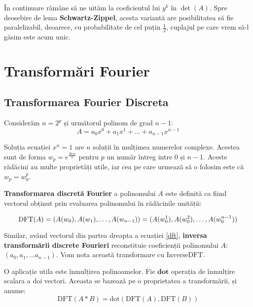 În continuare rămâne să ne uităm la coeficientul lui $y^{k}$ în $\det(A)$. Spre
deosebire de lema \textbf{Schwartz-Zippel}, acesta variantă are posibilitatea să fie
paralelizabil, deoarece, cu probabilitate de cel puțin $\frac{1}{2}$, cuplajul
pe care vrem să-l găsim este acum unic.

\pagebreak

\section{Transformări Fourier}

\subsection{Transformarea Fourier Discreta \cite{fft}}
Considerăm $n = 2^{p}$ și următorul polinom de grad $n-1$:
\begin{equation}
  A = a_{0}x^{0} + a_{1}x^{1} + \ldots + a_{n-1}x^{n-1}
\end{equation}

Soluția ecuației $x^{n} = 1$ are $n$ soluții în mulțimea numerelor complexe.
Acestea sunt de forma $w_{p} = e^{\frac{2k\pi i}{n}}$ pentru $p$ un număr întreg
intre $0$ și $n-1$. Aceste rădăcini au multe proprietăți utile, iar cea pe care
urmează să o folosim este că $w_{p} = w_{0}^{p}$. \par
\textbf{Transformarea discretă Fourier} a polinomului $A$ este definită ca fiind
vectorul obținut prin evaluarea polinomului în rădăcinile unității:

\begin{equation}
  \label{dft}
  \text{DFT}(A) = (A(w_{0}), A(w_{1}), \ldots, A(w_{n-1})) \\
                = (A(w_{0}^{1}), A(w_{0}^{2}), \ldots, A(w_{0}^{n-1}))
\end{equation}

Similar, având vectorul din partea dreapta a ecuației \ref{dft}, \textbf{inversa
transformării discrete Fourieri} reconstituie coeficienții polinomului $A$:
$(a_{0}, a_{1}, \ldots a_{n-1})$. Vom nota această transformare cu
$\text{InverseDFT}$. \par

O aplicație utila este înmulțirea polinoamelor. Fie $\textbf{dot}$ operația de
înmulțire scalara a doi vectori. Aceasta se bazează pe o
proprietatea a transformării, și anume:
\begin{equation}
  \text{DFT}(A * B) = \text{dot}(\text{DFT}(A), \text{DFT}(B))
\end{equation}

